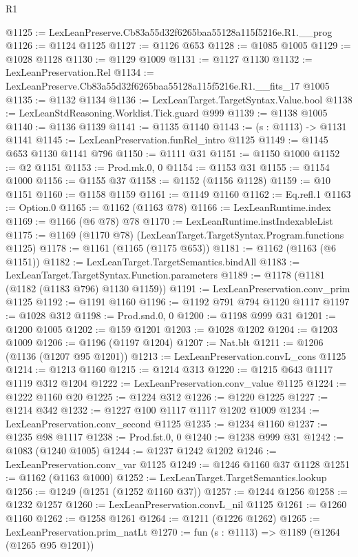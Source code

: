 \begin{lexlean}{R1}
\begin{coremodule}
@1125 := LexLeanPreserve.Cb83a55d32f6265baa55128a115f5216e.R1.__prog
@1126 := @1124 @1125
@1127 := @1126 @653
@1128 := @1085 @1005
@1129 := @1028 @1128
@1130 := @1129 @1009
@1131 := @1127 @1130
@1132 := LexLeanPreservation.Rel
@1134 := LexLeanPreserve.Cb83a55d32f6265baa55128a115f5216e.R1.__fits_17 @1005
@1135 := @1132 @1134
@1136 := LexLeanTarget.TargetSyntax.Value.bool
@1138 := LexLeanStdReasoning.Worklist.Tick.guard @999
@1139 := @1138 @1005
@1140 := @1136 @1139
@1141 := @1135 @1140
@1143 := (s : @1113) -> @1131 @1141
@1145 := LexLeanPreservation.funRel_intro @1125
@1149 := @1145 @653 @1130 @1141 @796
@1150 := @1111 @31
@1151 := @1150 @1000
@1152 := @2 @1151
@1153 := Prod.mk.{0, 0}
@1154 := @1153 @31
@1155 := @1154 @1000
@1156 := @1155 @37
@1158 := @1152 (@1156 @1128)
@1159 := @10 @1151
@1160 := @1158 @1159
@1161 := @1149 @1160
@1162 := Eq.refl.{1}
@1163 := Option.{0}
@1165 := @1162 (@1163 @78)
@1166 := LexLeanRuntime.index
@1169 := @1166 (@6 @78) @78
@1170 := LexLeanRuntime.instIndexableList
@1175 := @1169 (@1170 @78) (LexLeanTarget.TargetSyntax.Program.functions @1125)
@1178 := @1161 (@1165 (@1175 @653))
@1181 := @1162 (@1163 (@6 @1151))
@1182 := LexLeanTarget.TargetSemantics.bindAll
@1183 := LexLeanTarget.TargetSyntax.Function.parameters
@1189 := @1178 (@1181 (@1182 (@1183 @796) @1130 @1159))
@1191 := LexLeanPreservation.conv_prim @1125
@1192 := @1191 @1160
@1196 := @1192 @791 @794 @1120 @1117
@1197 := @1028 @312
@1198 := Prod.snd.{0, 0}
@1200 := @1198 @999 @31
@1201 := @1200 @1005
@1202 := @159 @1201
@1203 := @1028 @1202
@1204 := @1203 @1009
@1206 := @1196 (@1197 @1204)
@1207 := Nat.blt
@1211 := @1206 (@1136 (@1207 @95 @1201))
@1213 := LexLeanPreservation.convL_cons @1125
@1214 := @1213 @1160
@1215 := @1214 @313
@1220 := @1215 @643 @1117 @1119 @312 @1204
@1222 := LexLeanPreservation.conv_value @1125
@1224 := @1222 @1160 @20
@1225 := @1224 @312
@1226 := @1220 @1225
@1227 := @1214 @342
@1232 := @1227 @100 @1117 @1117 @1202 @1009
@1234 := LexLeanPreservation.conv_second @1125
@1235 := @1234 @1160
@1237 := @1235 @98 @1117
@1238 := Prod.fst.{0, 0}
@1240 := @1238 @999 @31
@1242 := @1083 (@1240 @1005)
@1244 := @1237 @1242 @1202
@1246 := LexLeanPreservation.conv_var @1125
@1249 := @1246 @1160 @37 @1128
@1251 := @1162 (@1163 @1000)
@1252 := LexLeanTarget.TargetSemantics.lookup
@1256 := @1249 (@1251 (@1252 @1160 @37))
@1257 := @1244 @1256
@1258 := @1232 @1257
@1260 := LexLeanPreservation.convL_nil @1125
@1261 := @1260 @1160
@1262 := @1258 @1261
@1264 := @1211 (@1226 @1262)
@1265 := LexLeanPreservation.prim_natLt
@1270 := fun (s : @1113) => @1189 (@1264 (@1265 @95 @1201))

\end{coremodule}
\end{lexlean}
